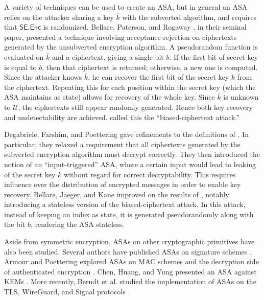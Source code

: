 A variety of techniques can be used to create an ASA, but in general an ASA relies on the attacker sharing a key $\overline{k}$ with the subverted algorithm, and requires that $\mathsf{SE.Enc}$ is randomized. Bellare, Paterson, and Rogaway \cite{C:BelPatRog14}, in their seminal paper, presented a technique involving acceptance-rejection on ciphertexts generated by the unsubverted encryption algorithm. A pseudorandom function is evaluated on $\overline{k}$ and a ciphertext, giving a single bit $b$. If the first bit of secret key is equal to $b$, then that ciphertext is returned; otherwise, a new one is computed. Since the attacker knows $\overline{k}$, he can recover the first bit of the secret key $k$ from the ciphertext. Repeating this for each position within the secret key (which the ASA maintains as state) allows for recovery of the whole key. Since $\overline{k}$ is unknown to $\mathcal{U}$, the ciphertexts still appear randomly generated. Hence both key recovery and undetectability are achieved. \cite{C:BelPatRog14} called this the ``biased-ciphertext attack.''


Degabriele, Farshim, and Poettering \cite{FSE:DegFarPoe15} gave refinements to the definitions of \cite{C:BelPatRog14}. In particular, they relaxed a requirement that all ciphertexts generated by the subverted encryption algorithm must decrypt correctly. They then introduced the notion of an ``input-triggered'' ASA, where a certain input would lead to leaking of the secret key $k$ without regard for correct decryptability. This requires influence over the distribution of encrypted messages in order to enable key recovery. Bellare, Jaeger, and Kane \cite{CCS:BelJaeKan15} improved on the results of \cite{C:BelPatRog14}, notably introducing a stateless version of the biased-ciphertext attack. In this attack, instead of keeping an index as state, it is generated pseudorandomly along with the bit $b$, rendering the ASA stateless.

Aside from symmetric encryption, ASAs on other cryptographic primitives have also been studied. Several authors have published ASAs on signature schemes \cite{CCS:AteMagVen15,BSKC2019,ACISP:LCWW18}. Armour and Poettering explored ASAs on MAC schemes and the decryption side of authenticated encryption \cite{ToSC:ArmPoe19,IMA:ArmPoe19}. Chen, Huang, and Yung presented an ASA against KEMs \cite{AC:CheHuaYun20}. More recently, Berndt et al. studied the implementation of ASAs on the TLS, WireGuard, and Signal protocols \cite{EPRINT:BWPTE20}.

